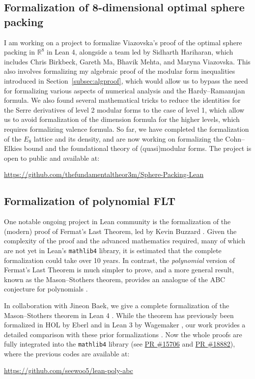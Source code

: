 \documentclass[letterpaper, 10pt]{article}
\begin{document}
\subsection{Formalization of 8-dimensional optimal sphere packing}

I am working on a project to formalize Viazovska's proof of the optimal sphere packing in $\mathbb{R}^{8}$ \cite{viazovska2017sphere} in Lean 4, alongside a team led by Sidharth Hariharan, which includes Chris Birkbeck, Gareth Ma, Bhavik Mehta, and Maryna Viazovska.
This also involves formalizing my algebraic proof of the modular form inequalities introduced in Section~\ref{subsec:algproof}, which would allow us to bypass the need for formalizing various aspects of numerical analysis and the Hardy--Ramanujan formula.
We also found several mathematical tricks to reduce the identities for the Serre derivatives of level 2 modular forms to the case of level 1, which allow us to avoid formalization of the dimension formula for the higher levels, which requires formalizing valence formula.
So far, we have completed the formalization of the $E_8$ lattice and its density, and are now working on formalizing the Cohn--Elkies bound and the foundational theory of (quasi)modular forms.
The project is open to public and available at:
\begin{center} \href{https://github.com/thefundamentaltheor3m/Sphere-Packing-Lean}{https://github.com/thefundamentaltheor3m/Sphere-Packing-Lean} \end{center}


\subsection{Formalization of polynomial FLT}

One notable ongoing project in Lean community is the formalization of the (modern) proof of Fermat's Last Theorem, led by Kevin Buzzard \cite{fltlean4}.
Given the complexity of the proof and the advanced mathematics required, many of which are not yet in Lean's \texttt{mathlib4} library, it is estimated that the complete formalization could take over 10 years.
In contrast, the \emph{polynomial} version of Fermat's Last Theorem is much simpler to prove, and a more general result, known as the Mason--Stothers theorem, provides an analogue of the ABC conjecture for polynomials \cite{stothers81,mason84}.

In collaboration with Jineon Baek, we give a complete formalization of the Mason--Stothers theorem in Lean 4 \cite{baek2024formalizing}.
While the theorem has previously been formalized in HOL by Eberl \cite{eberl17} and in Lean 3 by Wagemaker \cite{wagemaker18}, our work provides a detailed comparison with these prior formalizations \cite[Section 7]{baek2024formalizing}.
Now the whole proofs are fully integrated into the \texttt{mathlib4} library (see \href{https://github.com/leanprover-community/mathlib4/pull/15706}{PR \#15706} and \href{https://github.com/leanprover-community/mathlib4/pull/18882}{PR \#18882}), where the previous codes are available at:
\begin{center} \href{https://github.com/seewoo5/lean-poly-abc}{https://github.com/seewoo5/lean-poly-abc} \end{center}
\end{document}
